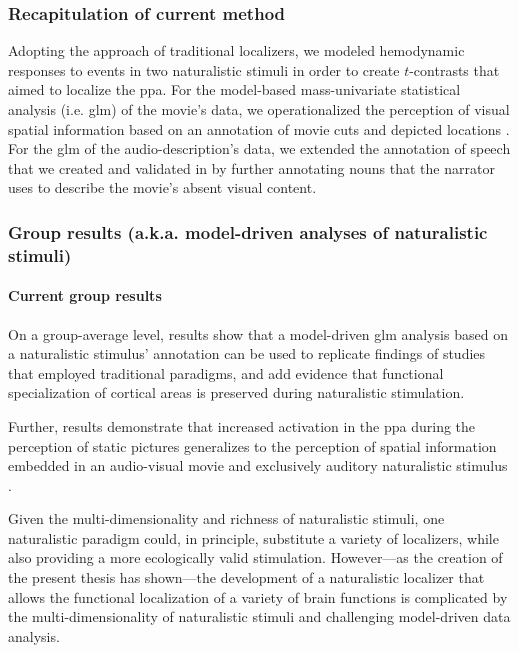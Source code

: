 \subsubsection{Recapitulation of current method}
Adopting the approach of traditional localizers, we modeled hemodynamic
responses to events in two naturalistic stimuli in order to create $t$-contrasts
that aimed to localize the \ac{ppa}.
For the model-based mass-univariate statistical analysis (i.e. \ac{glm}) of the
movie's data, we operationalized the perception of visual spatial information
based on an annotation of movie cuts and depicted locations
\citep{haeusler2016cutanno}.
For the \ac{glm} of the audio-description's data, we extended the annotation of
speech that we created and validated in \citep{haeusler2021speechanno} by
further annotating nouns that the narrator uses to describe the movie's absent
visual content.


\subsubsection{Group results (a.k.a. model-driven analyses of naturalistic
stimuli)}

\paragraph{Current group results}
On a group-average level, results show that a model-driven \ac{glm} analysis
based on a naturalistic stimulus' annotation can be used to replicate findings
of studies that employed traditional paradigms, and add evidence
\citep[cf.][]{bartels2004mapping} that functional specialization of cortical
areas is preserved during naturalistic stimulation.

Further, results demonstrate that increased activation in the \ac{ppa} during
the perception of static pictures generalizes to the perception of spatial
information embedded in an audio-visual movie and exclusively auditory
naturalistic stimulus \citep{haeusler2022processing}.


%
Given the multi-dimensionality and richness of naturalistic stimuli, one
naturalistic paradigm could, in principle, substitute a variety of localizers,
while also providing a more ecologically valid stimulation.
%
However---as the creation of the present thesis has shown---the development of a
naturalistic localizer that allows the functional localization of a variety of
brain functions is complicated by the multi-dimensionality of naturalistic
stimuli and challenging model-driven data analysis.


